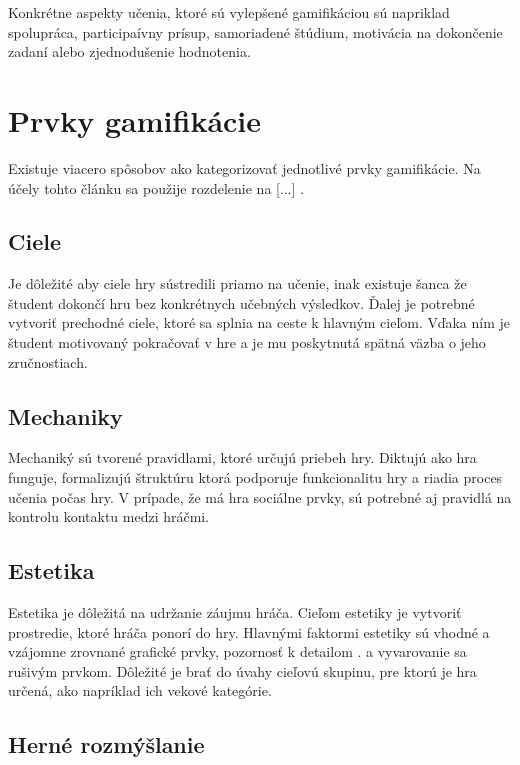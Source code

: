 \documentclass[10pt,twoside,slovak,a4paper]{article}
\begin{document}
Konkrétne aspekty učenia, ktoré sú vylepšené gamifikáciou sú napriklad spolupráca, participaívny prísup, samoriadené štúdium, motivácia na dokončenie zadaní alebo zjednodušenie hodnotenia. \cite{Kapp}

\section{Prvky gamifikácie} \label{prvky}

Existuje viacero spôsobov ako kategorizovať jednotlivé prvky gamifikácie. Na účely tohto článku sa použije rozdelenie na [...] .

\subsection{Ciele}

Je dôležité aby ciele hry sústredili priamo na učenie, inak existuje šanca že študent dokončí hru bez konkrétnych učebných výsledkov. Ďalej je potrebné vytvoriť prechodné ciele, ktoré sa splnia na ceste k hlavným cieľom. Vďaka ním je študent motivovaný pokračovať v hre a je mu poskytnutá spätná väzba o jeho zručnostiach.

\subsection{Mechaniky}

Mechaniký sú tvorené pravidlami, ktoré určujú priebeh hry. Diktujú ako hra funguje, formalizujú štruktúru ktorá podporuje funkcionalitu hry a riadia proces učenia počas hry. V prípade, že má hra sociálne prvky, sú potrebné aj pravidlá na kontrolu kontaktu medzi hráčmi. \cite{Rego}

\subsection{Estetika}

Estetika je dôležitá na udržanie záujmu hráča. Cieľom estetiky je vytvoriť prostredie, ktoré hráča ponorí do hry. Hlavnými faktormi estetiky sú vhodné a vzájomne zrovnané grafické prvky, pozornosť k detailom \cite{Kapp}. a vyvarovanie sa rušivým prvkom. Dôležité je brať do úvahy cieľovú skupinu, pre ktorú je hra určená, ako napríklad ich vekové kategórie. \cite{Rego}

\subsection{Herné rozmýšlanie}
\end{document}
